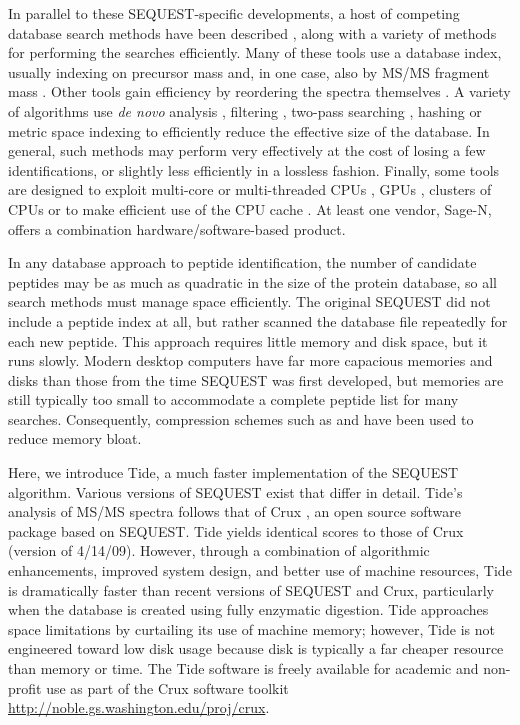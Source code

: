 In parallel to these SEQUEST-specific developments, a host of
competing database search methods have been described
\cite{perkins:probability, clauser:role, bafna:scope, zhang:probid,
  colinge:olav, tabb:myrimatch, geer:open, bern:lookup,
  roos:pepsplice, craig:tandem}, along with a variety of methods for
performing the searches efficiently.  Many of these tools use a
database index, usually indexing on precursor mass and, in one case,
also by MS/MS fragment mass \cite{tang:discovering}.  Other tools gain
efficiency by reordering the spectra themselves \cite{tabb:dbdigger}.
A variety of algorithms use {\em de novo} analysis \cite{bern:lookup},
filtering \cite{tanner:inspect}, two-pass searching
\cite{craig:tandem}, hashing \cite{dutta:speeding} or metric space
indexing \cite{ramakrishnan:fast} to efficiently reduce the effective
size of the database.  In general, such methods may perform very
effectively at the cost of losing a few identifications, or slightly
less efficiently in a lossless fashion.  Finally, some tools are
designed to exploit multi-core or multi-threaded CPUs
\cite{tabb:myrimatch}, GPUs \cite{baumgardner:fast}, clusters of CPUs
\cite{duncan:parallel} or to
make efficient use of the CPU cache \cite{roos:pepsplice, li:speeding}.  At
least one vendor, Sage-N, offers a combination hardware/software-based product.

In any database approach to peptide identification, the number of
candidate peptides may be as much as quadratic in the size of the
protein database, so all search methods must manage space
efficiently. The original SEQUEST did not include a peptide index at
all, but rather scanned the database file repeatedly for each new
peptide. This approach requires little memory and disk space, but it
runs slowly. Modern desktop computers have far more capacious memories
and disks than those from the time SEQUEST was first developed, but
memories are still typically too small to accommodate a complete
peptide list for many searches. Consequently, compression schemes such
as \cite{edwards:sequence} and \cite{edwards:novel} have been used to
reduce memory bloat.

Here, we introduce Tide, a much faster implementation of the SEQUEST
algorithm. Various versions of SEQUEST exist that differ in
detail. Tide's analysis of MS/MS spectra follows that of Crux
\cite{park:rapid}, an open source software package based on SEQUEST.
Tide yields identical \XCorr scores to those of Crux (version of
4/14/09).  However, through a combination of algorithmic enhancements,
improved system design, and better use of machine resources, Tide is
dramatically faster than recent versions of SEQUEST and Crux,
particularly when the database is created using fully enzymatic
digestion. Tide approaches space limitations by curtailing its use of
machine memory; however, Tide is not engineered toward low disk usage
because disk is typically a far cheaper resource than memory or time.
The Tide software is freely available for academic and non-profit use
as part of the Crux software toolkit
\url{http://noble.gs.washington.edu/proj/crux}.

